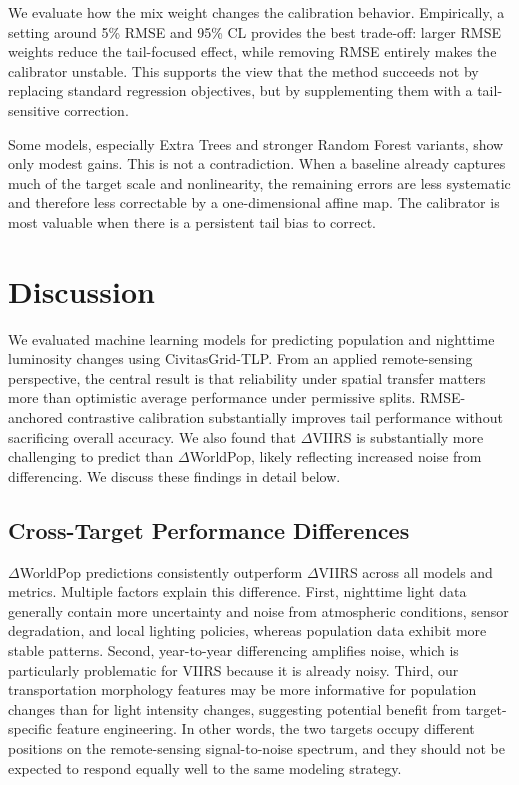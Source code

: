 \documentclass[preprint,12pt]{elsarticle}
\begin{document}
We evaluate how the mix weight changes the calibration behavior. Empirically, a setting around 5\% RMSE and 95\% CL provides the best trade-off: larger RMSE weights reduce the tail-focused effect, while removing RMSE entirely makes the calibrator unstable. This supports the view that the method succeeds not by replacing standard regression objectives, but by supplementing them with a tail-sensitive correction.

Some models, especially Extra Trees and stronger Random Forest variants, show only modest gains. This is not a contradiction. When a baseline already captures much of the target scale and nonlinearity, the remaining errors are less systematic and therefore less correctable by a one-dimensional affine map. The calibrator is most valuable when there is a persistent tail bias to correct.

\section{Discussion}

We evaluated machine learning models for predicting population and nighttime luminosity changes using CivitasGrid-TLP. From an applied remote-sensing perspective, the central result is that reliability under spatial transfer matters more than optimistic average performance under permissive splits. RMSE-anchored contrastive calibration substantially improves tail performance without sacrificing overall accuracy. We also found that $\Delta$VIIRS is substantially more challenging to predict than $\Delta$WorldPop, likely reflecting increased noise from differencing. We discuss these findings in detail below.

\subsection{Cross-Target Performance Differences}

$\Delta$WorldPop predictions consistently outperform $\Delta$VIIRS across all models and metrics. Multiple factors explain this difference. First, nighttime light data generally contain more uncertainty and noise from atmospheric conditions, sensor degradation, and local lighting policies, whereas population data exhibit more stable patterns. Second, year-to-year differencing amplifies noise, which is particularly problematic for VIIRS because it is already noisy. Third, our transportation morphology features may be more informative for population changes than for light intensity changes, suggesting potential benefit from target-specific feature engineering. In other words, the two targets occupy different positions on the remote-sensing signal-to-noise spectrum, and they should not be expected to respond equally well to the same modeling strategy.
\end{document}
